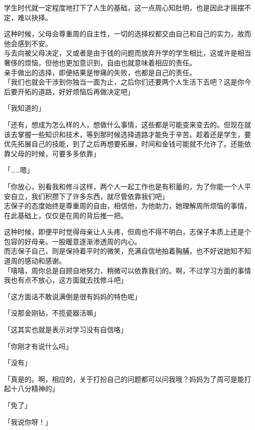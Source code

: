 学生时代就一定程度地打下了人生的基础，这一点周心知肚明，也是因此才摇摆不定，难以抉择。

这种时候，父母会尊重周的自主性，一切的选择权都交由自己和自己的实力，故而他会感到不安。\\

与去向被父母决定，又或者是由于钱的问题而放弃升学的学生相比，这或许是相当奢侈的烦恼，但他也更加意识到，自由也就意味着相应的责任。\\

亲手做出的选择，即便结果是惨痛的失败，也都是自己的责任。\\

「我们也就会干涉到你独当一面为止，之后你们还要两个人生活下去吧？这是你今后要开拓的道路，好好烦恼后再做决定吧」

「我知道的」

「还有，想成为怎么样的人，想做什么事情，这些都是可能变来变去的。但现在就该去掌握一些知识和技术，等到那时候选择道路才能免于辛苦。趁着还是学生，要优先拓展自己的技能，到了之后再想要拓展，时间和金钱可能就不允许了。还能依靠父母的时候，可要多多依靠」

「……嗯」

「你放心，别看我和修斗这样，两个人一起工作也是有积蓄的，为了你能一个人平安自立，我们积攒下了许多东西，就尽管依靠我们吧」\\

志保子的态度始终是尊重周的自由，相信他，为他助力，她理解周所烦恼的事情，在此基础上，仅仅是在周的背后推一把。

这种时候，即便平时觉得母亲让人头疼，但周也不得不明白，志保子本质上还是个包容的好母亲。一股暖意逐渐渗透周的内心。\\

而志保子自己，则是保持着平时的微笑，充满自信地拍着胸脯，也不好说她知不知道周的感动和感谢。\\

「嘻嘻，周你总是自顾自地努力，稍微可以依靠我们的。啊，不过学习方面的事情我也有点不放心，这方面就去找修斗吧」

「这方面话不敢说满倒是很有妈妈的特色呢」

「没那金刚钻，不揽瓷器活嘛」

「这其实也就是表示对学习没有自信咯」

「你刚才有说什么吗」

「没有」

「真是的。啊，相应的，关于打扮自己的问题都可以问我哦？妈妈为了周可是能打起十八分精神的」

「免了」

「我说你呀！」\\

